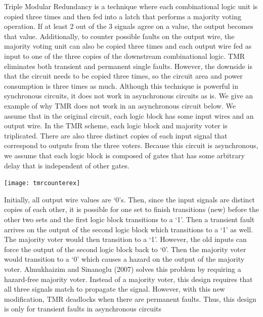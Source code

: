 \documentclass[12pt]{report}
\begin{document}
Triple Modular Redundancy is a technique where each combinational logic unit is copied three times and then fed into a latch that performs a majority voting operation. If at least 2 out of the 3 signals agree on a value, the output becomes that value.  Additionally, to counter possible faults on the output wire, the majority voting unit can also be copied three times and each output wire fed as input to one of the three copies of the downstream combinational logic. TMR eliminates both transient and permanent single faults.  However, the downside is that the circuit needs to be copied three times, so the circuit area and power consumption is three times as much.  Although this technique is powerful in synchronous circuits, it does not work in asynchronous circuits as is.  We give an example of why TMR does not work in an asynchronous circuit below. We assume that in the original circuit, each logic block has some input wires and an output wire. In the TMR scheme, each logic block and majority voter is triplicated. There are also three distinct copies of each input signal that correspond to outputs from the three voters. Because this circuit is asynchronous, we assume that each logic block is composed of gates that has some arbitrary delay that is independent of other gates.   
\begin{center}
\texttt{[image: tmrcounterex]}
\end{center}
Initially, all output wire values are `0's. Then, since the input signals are distinct copies of each other, it is possible for one set to finish transitions (new) before the other two sets and the first logic block transitions to a `1'. Then a transient fault arrives on the output of the second logic block which transitions to a `1' as well. The majority voter would then transition to a `1'. However, the old inputs can force the output of the second logic block back to `0'. Then the majority voter would transition to a `0' which causes a hazard on the output of the majority voter. %
Almukhaizim and Sinanoglu (2007) solves this problem by requiring a hazard-free majority voter.  Instead of a majority voter, this design requires that all three signals match to propagate the signal.  However, with this new modification, TMR deadlocks when there are permanent faults.  Thus, this design is only for transient faults in asynchronous circuits \\
\end{document}
